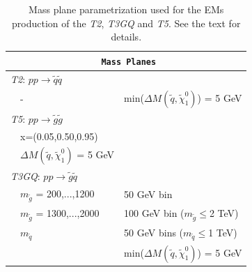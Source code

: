 \documentclass[a4paper,11pt]{article}
\newcommand{\TGQ}{ \textit{T3GQ}}
\newcommand{\Ttwo}{ \textit{T2}}
\newcommand{\Tfive}{ \textit{T5}}
\begin{document}
\begin{table}
	\footnotesize
	\begin{center}
		\small
		\renewcommand{\arraystretch}{1.0}
		\begin{tabular}{ l l l }  \toprule \toprule 
			\multicolumn{3}{c}{\texttt{ \normalsize \textbf{Mass Planes}}} \\ \toprule \toprule
			\multicolumn{3}{l}{\Ttwo: $p p \rightarrow \tilde q \tilde q$} \\
			& - & min($\Delta M(\tilde q, \tilde \chi _1 ^0)$) = 5 GeV \\ \midrule
			\multicolumn{3}{l}{\Tfive: $p p \rightarrow \tilde g \tilde g$} \\ 
			&x=(0.05,0.50,0.95) &  \\ 
			&$\Delta M(\tilde q, \tilde \chi _1 ^0)$ = 5 GeV&  \\ \midrule
			\multicolumn{3}{l}{\TGQ: $p p \rightarrow \tilde g \tilde q$} \\  
			& $m_{\tilde g}$ = 200,...,1200 & 50 GeV bin \\ 
			& $m_{\tilde g}$ = 1300,...,2000 & 100 GeV bin ($m_{\tilde g}\leq$2 TeV) \\
			& $m_{\tilde q}$ & 50 GeV bins ($m_{\tilde q}\leq$1 TeV) \\
			& & min($\Delta M(\tilde q, \tilde \chi _1 ^0)$) = 5 GeV \\ \bottomrule \bottomrule
		\end{tabular}
	\end{center}
	\normalsize
	\caption{Mass plane parametrization used for the EMs production of the \textit{T2}, \textit{T3GQ} and \textit{T5}. See the text for details.}
	\label{TGQ_Planes} 
\end{table}
%
\end{document}
